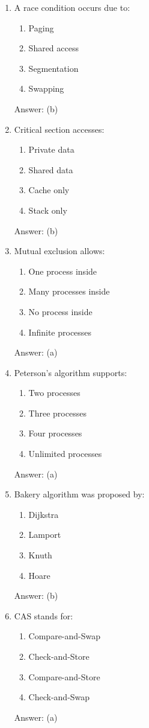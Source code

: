 \begin{enumerate}
\item A race condition occurs due to:
\begin{enumerate}[label=(\alph*)]
\item Paging
\item Shared access
\item Segmentation
\item Swapping
\end{enumerate}
Answer: (b)

\item Critical section accesses:
\begin{enumerate}[label=(\alph*)]
\item Private data
\item Shared data
\item Cache only
\item Stack only
\end{enumerate}
Answer: (b)

\item Mutual exclusion allows:
\begin{enumerate}[label=(\alph*)]
\item One process inside
\item Many processes inside
\item No process inside
\item Infinite processes
\end{enumerate}
Answer: (a)

\item Peterson's algorithm supports:
\begin{enumerate}[label=(\alph*)]
\item Two processes
\item Three processes
\item Four processes
\item Unlimited processes
\end{enumerate}
Answer: (a)

\item Bakery algorithm was proposed by:
\begin{enumerate}[label=(\alph*)]
\item Dijkstra
\item Lamport
\item Knuth
\item Hoare
\end{enumerate}
Answer: (b)

\item CAS stands for:
\begin{enumerate}[label=(\alph*)]
\item Compare-and-Swap
\item Check-and-Store
\item Compare-and-Store
\item Check-and-Swap
\end{enumerate}
Answer: (a)


\end{enumerate}
